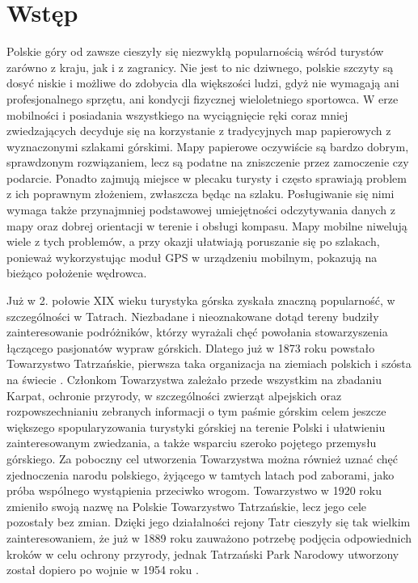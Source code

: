 \section{Wstęp}

Polskie góry od zawsze cieszyły się niezwykłą popularnością wśród turystów zarówno z kraju, jak i z zagranicy. Nie jest to nic dziwnego, polskie szczyty są dosyć niskie i możliwe do zdobycia dla większości ludzi, gdyż nie wymagają ani profesjonalnego sprzętu, ani kondycji fizycznej wieloletniego sportowca.
W erze mobilności i posiadania wszystkiego na wyciągnięcie ręki coraz mniej zwiedzających decyduje się na korzystanie z tradycyjnych map papierowych z wyznaczonymi szlakami górskimi. Mapy papierowe oczywiście są bardzo dobrym, sprawdzonym rozwiązaniem, lecz są podatne na zniszczenie przez zamoczenie czy podarcie. Ponadto zajmują miejsce w plecaku turysty i często sprawiają problem z ich poprawnym złożeniem, zwłaszcza będąc na szlaku. Posługiwanie się nimi wymaga także przynajmniej podstawowej umiejętności odczytywania danych z mapy oraz dobrej orientacji w terenie i obsługi kompasu. Mapy mobilne niwelują wiele z tych problemów, a przy okazji ułatwiają poruszanie się po szlakach, ponieważ wykorzystując moduł GPS w urządzeniu mobilnym, pokazują na bieżąco położenie wędrowca.

Już w 2. połowie XIX wieku turystyka górska zyskała znaczną popularność, w szczególności w Tatrach. Niezbadane i nieoznakowane dotąd tereny budziły zainteresowanie podróżników, którzy wyrażali chęć powołania stowarzyszenia łączącego pasjonatów wypraw górskich. Dlatego już w 1873 roku powstało Towarzystwo Tatrzańskie, pierwsza taka organizacja na ziemiach polskich i szósta na świecie \cite{ptt}. Członkom Towarzystwa zależało przede wszystkim na zbadaniu Karpat, ochronie przyrody, w szczególności zwierząt alpejskich oraz rozpowszechnianiu zebranych informacji o tym paśmie górskim celem jeszcze większego spopularyzowania turystyki górskiej na terenie Polski i ułatwieniu zainteresowanym zwiedzania, a także wsparciu szeroko pojętego przemysłu górskiego. Za poboczny cel utworzenia Towarzystwa można również uznać chęć zjednoczenia narodu polskiego, żyjącego w tamtych latach pod zaborami, jako próba wspólnego wystąpienia przeciwko wrogom. Towarzystwo w 1920 roku zmieniło swoją nazwę na Polskie Towarzystwo Tatrzańskie, lecz jego cele pozostały bez zmian. Dzięki jego działalności rejony Tatr cieszyły się tak wielkim zainteresowaniem, że już w 1889 roku zauważono potrzebę podjęcia odpowiednich kroków w celu ochrony przyrody, jednak Tatrzański Park Narodowy utworzony został dopiero po wojnie w 1954 roku \cite{tpn}.

